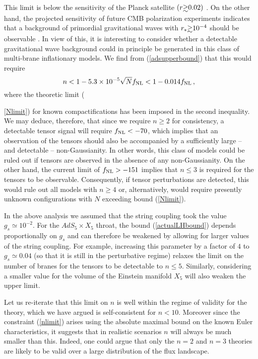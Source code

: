 This limit is below the sensitivity of the Planck satellite 
$(r \gsim 0.02 )$ \cite{planck}. On the other hand, 
the projected sensitivity of future CMB polarization experiments 
indicates that a background of primordial 
gravitational waves with $r_* \gsim 10^{-4}$ 
should be observable \cite{songknox,vpj}. In view of this, 
it is interesting to consider whether
a detectable gravitational wave background could in principle 
be generated in this class of multi-brane inflationary 
models. We find from (\ref{adsupperbound}) that this would require 
\begin{equation}
\label{nlimit}
n < 1 -5.3 \times 10^{-5} \sqrt{N} f_{\mathrm{NL}} < 1-0.014 f_{\mathrm{NL}} \,,
\end{equation}
where the theoretic limit ({\ref{Nlimit}) for 
known compactifications has been imposed in the 
second inequality. We may deduce, therefore, that  
since we require $n \ge 2$ for consistency, a detectable tensor 
signal will require $f_{\mathrm{NL}} < -70$, which implies that an observation of 
the tensors should also be 
accompanied by a sufficiently large -- and detectable -- non-Gaussianity. 
In other words, this class of models could  
be ruled out if tensors are observed in the absence of any
non-Gaussianity. On the other hand, the current 
limit of  $f_{\mathrm{NL}} >-151$ implies that $n \le 3$ is required 
for the tensors to be observable. 
Consequently, if tensor perturbations are detected, this would rule 
out all models with $n \ge  4$ or, alternatively, would require presently 
unknown configurations with $N$ exceeding bound (\ref{Nlimit}). 

In the above analysis we assumed that the string coupling 
took the value $g_s \simeq 10^{-2}$. For the $AdS_5 \times X_5$ throat, 
the bound (\ref{actualLHbound}) depends proportionally on $g_s$ and can 
therefore be weakened by allowing for larger values of the string coupling. 
For example, increasing this parameter by a factor of $4$ 
to $g_s \simeq 0.04$ (so that it is still in the perturbative regime)
relaxes the limit on the number of branes for the tensors to be detectable to 
$n \le 5$. Similarly, considering a smaller value for the 
volume of the Einstein manifold $X_5$ will also weaken the upper limit. 

Let us re-iterate that this limit on $n$ is well within the 
regime of validity for the theory, which we have argued is 
self-consistent for $n<10$. Moreover since the constraint (\ref{nlimit})
arises using the absolute maximal bound on the known 
Euler characteristics, it suggests that in realistic scenarios $n$ will 
always be much smaller than this. Indeed, one could argue that 
only the $n=2$ and $n=3$ theories are
likely to be valid over a large distribution of the flux landscape. 

}
